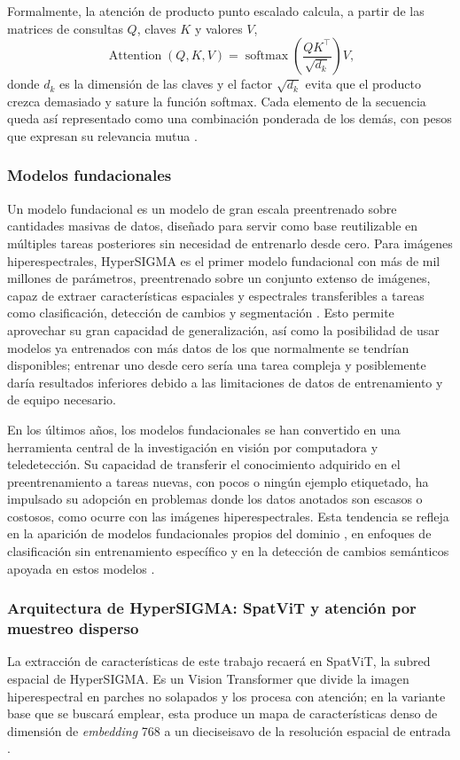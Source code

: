 \documentclass[12pt,onecolumn]{IEEEtran}
\begin{document}
Formalmente, la atención de producto punto escalado calcula, a partir de las matrices de consultas $Q$, claves $K$ y valores $V$,
\begin{equation}
\operatorname{Attention}(Q,K,V)=\operatorname{softmax}\!\left(\frac{QK^{\top}}{\sqrt{d_k}}\right)V,
\end{equation}
donde $d_k$ es la dimensión de las claves y el factor $\sqrt{d_k}$ evita que el producto crezca demasiado y sature la función softmax. Cada elemento de la secuencia queda así representado como una combinación ponderada de los demás, con pesos que expresan su relevancia mutua \cite{vaswani2017attention}.

\subsubsection{Modelos fundacionales}
Un modelo fundacional es un modelo de gran escala preentrenado sobre cantidades masivas de datos, diseñado para servir como base reutilizable en múltiples tareas posteriores sin necesidad de entrenarlo desde cero. Para imágenes hiperespectrales, HyperSIGMA es el primer modelo fundacional con más de mil millones de parámetros, preentrenado sobre un conjunto extenso de imágenes, capaz de extraer características espaciales y espectrales transferibles a tareas como clasificación, detección de cambios y segmentación \cite{wang2024hypersigma}. Esto permite aprovechar su gran capacidad de generalización, así como la posibilidad de usar modelos ya entrenados con más datos de los que normalmente se tendrían disponibles; entrenar uno desde cero sería una tarea compleja y posiblemente daría resultados inferiores debido a las limitaciones de datos de entrenamiento y de equipo necesario.

En los últimos años, los modelos fundacionales se han convertido en una herramienta central de la investigación en visión por computadora y teledetección. Su capacidad de transferir el conocimiento adquirido en el preentrenamiento a tareas nuevas, con pocos o ningún ejemplo etiquetado, ha impulsado su adopción en problemas donde los datos anotados son escasos o costosos, como ocurre con las imágenes hiperespectrales. Esta tendencia se refleja en la aparición de modelos fundacionales propios del dominio \cite{wang2024hypersigma}, en enfoques de clasificación sin entrenamiento específico \cite{pang2025special} y en la detección de cambios semánticos apoyada en estos modelos \cite{zhu2025semanticcd}.

\subsubsection{Arquitectura de HyperSIGMA: SpatViT y atención por muestreo disperso}
La extracción de características de este trabajo recaerá en SpatViT, la subred espacial de HyperSIGMA. Es un Vision Transformer que divide la imagen hiperespectral en parches no solapados y los procesa con atención; en la variante base que se buscará emplear, esta produce un mapa de características denso de dimensión de \textit{embedding} 768 a un dieciseisavo de la resolución espacial de entrada \cite{wang2024hypersigma}.
\end{document}
